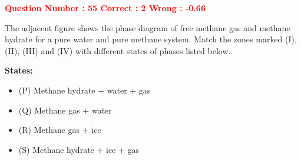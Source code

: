 \documentclass[12pt]{article}
\begin{document}
{\vspace{1em}


\textcolor{red}{\textbf{Question Number : 55 \hfill Correct : 2  Wrong : -0.66}}

\vspace{0.5em}

\begin{minipage}{0.58\textwidth}
The adjacent figure shows the phase diagram of free methane gas and methane hydrate for a pure water and pure methane system. Match the zones marked (I), (II), (III) and (IV) with different states of phases listed below.

\vspace{1em}

\textbf{States:}
\begin{itemize}[leftmargin=*]
  \item (P) Methane hydrate + water + gas  
  \item (Q) Methane gas + water  
  \item (R) Methane gas + ice  
  \item (S) Methane hydrate + ice + gas  
\end{itemize}

\vspace{0.5em}


\end{minipage}}
\end{document}
